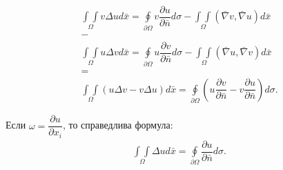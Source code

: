 \begin{theorem}
$$
\begin{gathered}
\underset{\Omega}{\int\int} v \Delta u d\bar{x} = \oint\limits_{\partial \Omega} v \dfrac{\partial u}{\partial \bar{n}} d\sigma - \underset{\Omega}{\int\int} (\bar{\nabla}v, \bar{\nabla}u)d\bar{x} \\
- \\
\underset{\Omega}{\int\int} u \Delta v d \bar{x} = \oint\limits_{\partial \Omega} u \dfrac{\partial v}{\partial \bar{n}}d\sigma - \underset{\Omega}{\int\int} (\bar{\nabla}u, \bar{\nabla}v)d\bar{x} \\
= \\
\underset{\Omega}{\int\int} (u \Delta v - v \Delta u)d\bar{x} = \oint\limits_{\partial \Omega} (u \dfrac{\partial v}{\partial \bar{n}} - v \dfrac{\partial u}{\partial \bar{n}})d\sigma.
\end{gathered}
$$
\end{theorem}

\begin{theorem}
	Если $ \omega = \dfrac{\partial u}{\partial x_i}$, то справедлива формула:
	$$\begin{gathered}
		\underset{\Omega}{\int\int} \Delta u d\bar{x} = \oint\limits_{\partial \Omega} \dfrac{\partial u}{\partial \bar{n}}d\sigma.
	\end{gathered}$$
\end{theorem}
